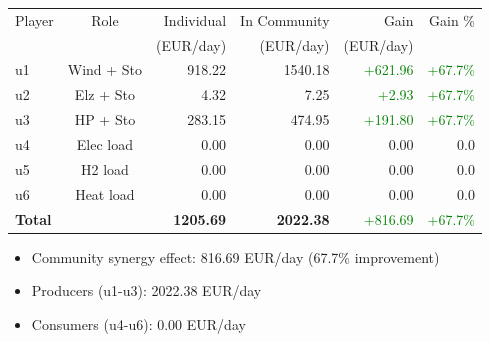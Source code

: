 \begin{frame}
    \begin{table}[h]
    \centering
    \small
    \begin{tabular}{l|c|r|r|r|r}
    \toprule
    Player & Role & Individual & In Community & Gain & Gain \% \\
        &      & (EUR/day) & (EUR/day) & (EUR/day) & \\
    \midrule
    u1 & Wind + Sto & 918.22 & 1540.18 & \textcolor{green}{+621.96} & \textcolor{green}{+67.7\%} \\
u2 & Elz + Sto & 4.32 & 7.25 & \textcolor{green}{+2.93} & \textcolor{green}{+67.7\%} \\
u3 & HP + Sto & 283.15 & 474.95 & \textcolor{green}{+191.80} & \textcolor{green}{+67.7\%} \\
u4 & Elec load & 0.00 & 0.00 & 0.00 & 0.0 \\
u5 & H2 load & 0.00 & 0.00 & 0.00 & 0.0 \\
u6 & Heat load & 0.00 & 0.00 & 0.00 & 0.0 \\
\midrule
    \textbf{Total} & & \textbf{1205.69} & \textbf{2022.38} & \textcolor{green}{+816.69} & \textcolor{green}{+67.7\%} \\
    \bottomrule
    \end{tabular}
    \end{table}

    \vspace{0.5em}
    \begin{itemize}
    \item Community synergy effect: 816.69 EUR/day (67.7\% improvement)
    \item Producers (u1-u3): 2022.38 EUR/day
    \item Consumers (u4-u6): 0.00 EUR/day
    \end{itemize}
    \end{frame}